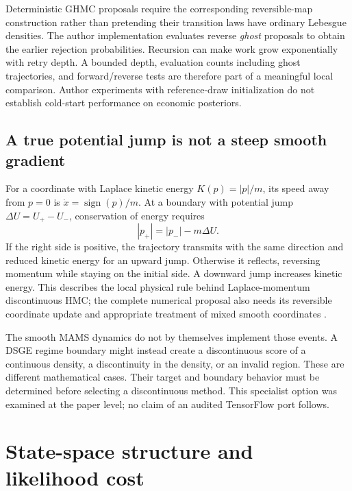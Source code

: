 Deterministic GHMC proposals require the corresponding reversible-map
construction rather than pretending their transition laws have ordinary
Lebesgue densities. The author implementation evaluates reverse
\emph{ghost} proposals to obtain the earlier rejection probabilities.
Recursion can make work grow exponentially with retry depth. A bounded depth,
evaluation counts including ghost trajectories, and forward/reverse tests
are therefore part of a meaningful local comparison. Author experiments with
reference-draw initialization do not establish cold-start performance on
economic posteriors.

\subsection{A true potential jump is not a steep smooth gradient}

For a coordinate with Laplace kinetic energy $K(p)=|p|/m$, its speed away
from $p=0$ is $\dot x=\operatorname{sign}(p)/m$. At a boundary with potential
jump $\Delta U=U_+-U_-$, conservation of energy requires
\begin{equation}
 |p_+|=|p_-|-m\Delta U.
 \label{eq:bf-modern-jump-energy}
\end{equation}
If the right side is positive, the trajectory transmits with the same
direction and reduced kinetic energy for an upward jump. Otherwise it
reflects, reversing momentum while staying on the initial side. A downward
jump increases kinetic energy. This describes the local physical rule behind
Laplace-momentum discontinuous HMC; the complete numerical proposal also needs
its reversible coordinate update and appropriate treatment of mixed smooth
coordinates \citep{nishimura2020discontinuous}.

The smooth MAMS dynamics do not by themselves implement those events. A DSGE regime
boundary might instead create a discontinuous score of a continuous density,
a discontinuity in the density, or an invalid region. These are different
mathematical cases. Their target and boundary behavior must be determined
before selecting a discontinuous method. This specialist option was examined
at the paper level; no claim of an audited TensorFlow port follows.

\section{State-space structure and likelihood cost}
\label{sec:bf-modern-state-space}


